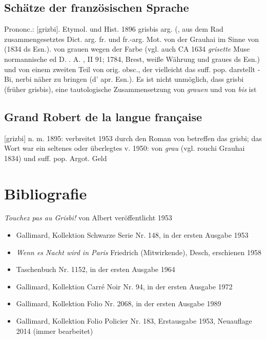 \subsection*{Schätze der französischen Sprache}
Prononc.: [grizbi]. Etymol. und Hist. 1896 grisbis arg.  (, aus dem Rad zusammengesetztes Dict. arg. fr. und fr.-arg. Mot. von der Grauhai im Sinne von  (1834 ds Esn.). von grauen wegen der Farbe (vgl. auch CA 1634 \emph{grisette}  Muse normannische ed D. . A. , II 91; 1784, Brest, weiße Währung und graues ds Esn.) und von einem zweiten Teil von orig. obsc., der vielleicht das suff. pop. darstellt - Bi, nerbi näher zu bringen  (d' apr. Esn.). Es ist nicht unmöglich, dass grisbi (früher grisbis), eine tautologische Zusammensetzung von \emph{grauen} und von \emph{bis} ist

\subsection*{Grand Robert de la langue française}
[grizbi] n. m. 1895: verbreitet 1953 durch den Roman von  betreffen das grisbi; das Wort war ein seltenes oder überlegtes v. 1950: von \emph{grau}  (vgl. rouchi Grauhai  1834) und suff. pop. Argot. Geld


\section{Bibliografie\label{preamble-biblio}}

\emph{Touchez pas au Grisbi!} von Albert  veröffentlicht 1953

\begin{itemize}\itemsep=-3pt
	\item Gallimard, Kollektion Schwarze Serie Nr. 148, in der ersten Ausgabe 1953
	\item \emph{Wenn es Nacht wird in Paris} Friedrich  (Mitwirkende), Desch, erschienen 1958
	\item Taschenbuch Nr. 1152, in der ersten Ausgabe 1964
	\item Gallimard, Kollektion Carré Noir Nr. 94, in der ersten Ausgabe 1972
	\item Gallimard, Kollektion Folio Nr. 2068, in der ersten Ausgabe 1989
	\item Gallimard, Kollektion Folio Policier Nr. 183, Erstausgabe 1953, Neuauflage 2014 (immer bearbeitet)
\end{itemize}

